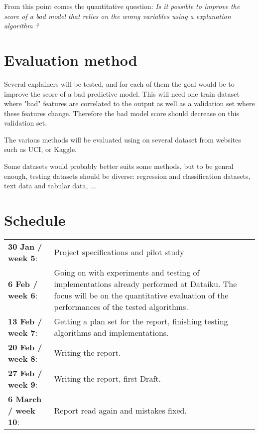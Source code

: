 \documentclass[a4paper]{article}
\begin{document}
From this point comes the quantitative question: \textit{Is it possible to improve the score of a bad model that relies on the wrong variables using a explanation algorithm ?}

\section{Evaluation method}

Several explainers will be tested, and for each of them the goal would be to improve the score of a bad predictive model. This will need one train dataset where "bad" features are correlated to the output as well as a validation set where these features change. Therefore the bad model score should decrease on this validation set.

The various methods will be evaluated using on several dataset from websites such as UCI, or Kaggle.

Some datasets would probably better suits some methods, but to be genral enough, testing datasets should be diverse: regression and classification datasets, text data and tabular data, ...

\section{Schedule}

\begin{tabularx}{\linewidth}{lX}

\textbf{30 Jan / week 5}: & Project specifications and pilot study \\

\textbf{6 Feb / week 6}: & Going on with experiments and testing of implementations already performed at Dataiku. The focus will be on the quantitative evaluation of the performances of the tested algorithms. \\

\textbf{13 Feb / week 7}: & Getting a plan set for the report, finishing testing algorithms and implementations. \\

\textbf{20 Feb / week 8}: & Writing the report. \\

\textbf{27 Feb / week 9}: & Writing the report, first Draft. \\

\textbf{6 March / week 10}: & Report read again and mistakes fixed.

\end{tabularx}
\end{document}
